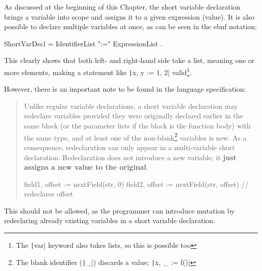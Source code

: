 As discussed at the beginning of this Chapter, the short variable declaration brings
a variable into scope and assigns it to a given expression (value). It is also
possible to declare multiple variables at once, as can be seen in the \gls{ebnf}
notation:
\begin{code}
    \begin{bnfcode}
ShortVarDecl = IdentifierList ":=" ExpressionList .
    \end{bnfcode}
\end{code}
This clearly shows that both left- and right-hand side take a list, meaning one or more
elements, making a statement like \texttt|x, y := 1, 2| valid\footnote{The
\texttt|var| keyword also takes lists, so this is possible too}.

However, there is an important note to be found in the language specification:

\begin{quote}
Unlike regular variable declarations, a short variable declaration may redeclare
variables provided they were originally declared earlier in the same block (or
the parameter lists if the block is the function body) with the same type, and
at least one of the non-blank\footnote{The blank identifier (\texttt|_|)
    discards a value; \texttt|x, _ := f()|} variables is new. As a consequence, redeclaration
can only appear in a multi-variable short declaration. Redeclaration does not
introduce a new variable; it \textbf{just assigns a new value to the original}.
    \begin{gocode}
field1, offset := nextField(str, 0)
field2, offset := nextField(str, offset)  // redeclares offset
    \end{gocode}
\autocite{short-hand-decl}
\end{quote}

This should not be allowed, as the programmer can introduce mutation by redeclaring
already existing variables in a short variable declaration.
